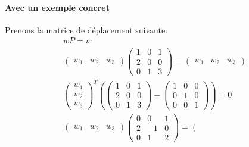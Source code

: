 \documentclass[letterpaper]{article}
\begin{document}
    \paragraph{Avec un exemple concret}
    Prenons la matrice de déplacement suivante:
    \begin{align*} 
      wP = w\\ 
      \left( 
	\begin{array}{ccc}
	w_1 & w_2 & w_3
	\end{array} 
      \right) 
      \left( 
	\begin{array}{ccc}
	1 & 0 & 1 \\
	2 & 0 & 0 \\
	0 & 1 & 3 
	\end{array} 
      \right)
      = 
      \left( 
	\begin{array}{ccc}
	w_1 & w_2 & w_3
	\end{array} 
      \right)  
      \\
      \left( 
	\begin{array}{c}
	w_1\\
	w_2\\
	w_3
	\end{array} 
      \right)^T
      \left(
	\left(
	\begin{array}{ccc}
	1 & 0 & 1 \\
	2 & 0 & 0 \\
	0 & 1 & 3 
	\end{array} 
	\right)
	-
	\left(
	\begin{array}{ccc}
	1 & 0 & 0 \\
	0 & 1 & 0 \\
	0 & 0 & 1 
	\end{array} 
	\right)
      \right)
      = 0
      \\ 
      \left( 
	\begin{array}{ccc}
	w_1 & w_2 & w_3
	\end{array} 
      \right)
      \left( 
	\begin{array}{ccc}
	0 & 0 & 1 \\
	2 & -1 & 0 \\
	0 & 1 & 2 
	\end{array} 
      \right) 
      = 
      \left( 
	\begin{array}{ccc}

\end{array}
\end{align*}
\end{document}
